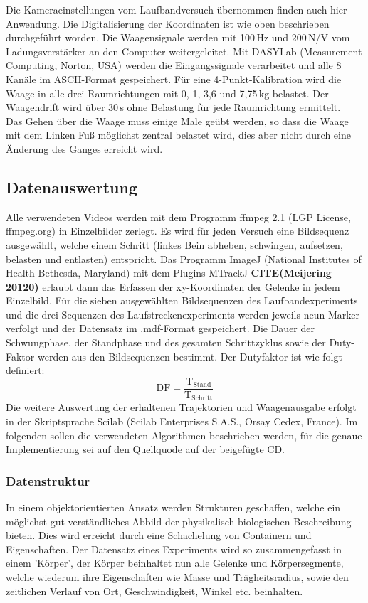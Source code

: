 Die Kameraeinstellungen vom Laufbandversuch übernommen finden auch hier Anwendung. Die Digitalisierung der Koordinaten ist wie oben beschrieben durchgeführt worden. Die Waagensignale werden mit 100\,Hz und 200\,N/V vom Ladungsverstärker an den Computer weitergeleitet. Mit DASYLab (Measurement Computing, Norton, USA) werden die Eingangssignale verarbeitet und alle 8 Kanäle im ASCII-Format gespeichert.
Für eine 4-Punkt-Kalibration wird die Waage in alle drei Raumrichtungen mit 0, 1, 3,6 und 7,75\,kg belastet. Der Waagendrift wird über 30\,s ohne Belastung für jede Raumrichtung ermittelt.\\
Das Gehen über die Waage muss einige Male geübt werden, so dass die Waage mit dem Linken Fuß möglichst zentral belastet wird, dies aber nicht durch eine Änderung des Ganges erreicht wird. 

\subsection{Datenauswertung}
Alle verwendeten Videos werden mit dem Programm ffmpeg 2.1 (LGP License, ffmpeg.org) in Einzelbilder zerlegt. Es wird für jeden Versuch eine Bildsequenz ausgewählt, welche einem Schritt (linkes Bein abheben, schwingen, aufsetzen, belasten und entlasten) entspricht. Das Programm ImageJ (National Institutes of Health Bethesda, Maryland) mit dem Plugins MTrackJ \textbf{CITE(Meijering 20120)} erlaubt dann das Erfassen der xy-Koordinaten der Gelenke in jedem Einzelbild. Für die sieben ausgewählten Bildsequenzen des Laufbandexperiments und die drei Sequenzen des Laufstreckenexperiments werden jeweils neun Marker verfolgt und der Datensatz im .mdf-Format gespeichert.
Die Dauer der Schwungphase, der Standphase und des gesamten Schrittzyklus sowie der Duty-Faktor werden aus den Bildsequenzen bestimmt. Der Dutyfaktor ist wie folgt definiert:
\begin{equation}
\mathrm{DF} = \frac{\mathrm{T_{Stand}}}{\mathrm{T_{Schritt}}}
\end{equation}
Die weitere Auswertung der erhaltenen Trajektorien und Waagenausgabe erfolgt in der Skriptsprache Scilab (Scilab Enterprises S.A.S., Orsay Cedex, France). Im folgenden sollen die verwendeten Algorithmen beschrieben werden, für die  genaue Implementierung sei auf den Quellquode auf der beigefügte CD.\\
\subsubsection{Datenstruktur}
In einem objektorientierten Ansatz werden Strukturen geschaffen, welche ein möglichst gut verständliches Abbild der physikalisch-biologischen Beschreibung bieten. Dies wird erreicht durch eine Schachelung von Containern und Eigenschaften. Der Datensatz eines Experiments wird so zusammengefasst in einem 'Körper', der Körper beinhaltet nun alle Gelenke und Körpersegmente, welche wiederum ihre Eigenschaften wie Masse und Trägheitsradius, sowie den zeitlichen Verlauf von Ort, Geschwindigkeit, Winkel etc. beinhalten. 
